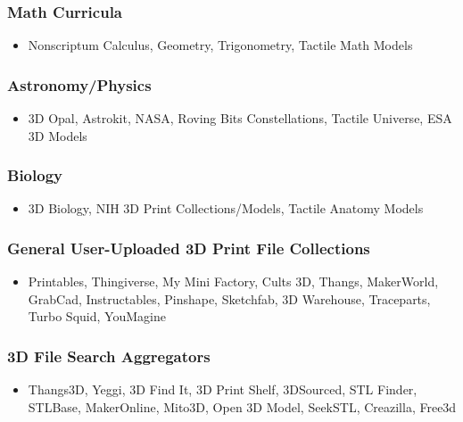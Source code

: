 \subsubsection{Math Curricula}

\begin{itemize}
    \item Nonscriptum Calculus, Geometry, Trigonometry, Tactile Math Models
\end{itemize}

\subsubsection{Astronomy/Physics}

\begin{itemize}
    \item 3D Opal, Astrokit, NASA, Roving Bits Constellations, Tactile Universe, ESA 3D Models
\end{itemize}

\subsubsection{Biology}

\begin{itemize}
    \item 3D Biology, NIH 3D Print Collections/Models, Tactile Anatomy Models
\end{itemize}

\subsubsection{General User-Uploaded 3D Print File Collections}

\begin{itemize}
    \item Printables, Thingiverse, My Mini Factory, Cults 3D, Thangs, MakerWorld, GrabCad, Instructables, Pinshape, Sketchfab, 3D Warehouse, Traceparts, Turbo Squid, YouMagine
\end{itemize}

\subsubsection{3D File Search Aggregators}

\begin{itemize}
    \item Thangs3D, Yeggi, 3D Find It, 3D Print Shelf, 3DSourced, STL Finder, STLBase, MakerOnline, Mito3D, Open 3D Model, SeekSTL, Creazilla, Free3d
\end{itemize}

